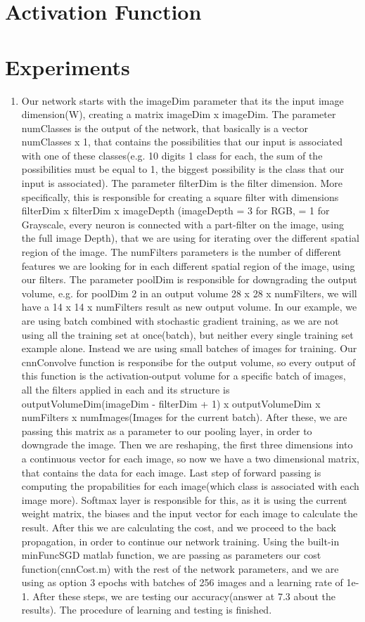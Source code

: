 \documentclass{article}
\begin{document}
\section{Activation Function}

\section{Experiments}
\begin{enumerate}
\item Our network starts with the imageDim parameter that its the input image dimension(W), creating a matrix imageDim x imageDim. The parameter numClasses is the output of the network, that basically is a vector numClasses x 1, that contains the possibilities that our input is associated with one of these classes(e.g. 10 digits 1 class for each, the sum of the possibilities must be equal to 1, the biggest possibility is the class that our input is associated). The parameter filterDim is the filter dimension. More specifically, this is responsible for creating a square filter with dimensions filterDim x filterDim x imageDepth (imageDepth = 3 for RGB, = 1 for Grayscale, every neuron is connected with a part-filter on the image, using the full image Depth), that we are using for iterating over the different spatial region of the image. The numFilters parameters is the number of different features we are looking for in each different spatial region of the image, using our filters. The parameter poolDim is responsible for downgrading the output volume, e.g. for poolDim 2 in an output volume 28 x 28 x numFilters, we will have a 14 x 14 x numFilters result as new output volume. In our example, we are using batch combined with stochastic gradient training, as we are not using all the training set at once(batch), but neither every single training set example alone. Instead we are using small batches of images for training. Our cnnConvolve function is responsibe for the output volume, so every output of this function is the activation-output volume for a specific batch of images, all the filters applied in each and its structure is outputVolumeDim(imageDim - filterDim + 1) x outputVolumeDim x numFilters x numImages(Images for the current batch). After these, we are passing this matrix as a parameter to our pooling layer, in order to downgrade the image. Then we are reshaping, the first three dimensions into a continuous vector for each image, so now we have a two dimensional matrix, that contains the data for each image. Last step of forward passing is computing the propabilities for each image(which class is associated with each image more). Softmax layer is responsible for this, as it is using the current weight matrix, the biases and the input vector for each image to calculate the result. After this we are calculating the cost, and we proceed to the back propagation, in order to continue our network training. Using the built-in minFuncSGD matlab function, we are passing as parameters our cost function(cnnCost.m) with the rest of the network parameters, and we are using as option 3 epochs with batches of 256 images and a learning rate of 1e-1. After these steps, we are testing our accuracy(answer at 7.3 about the results). The procedure of learning and testing is finished.

\end{enumerate}
\end{document}

